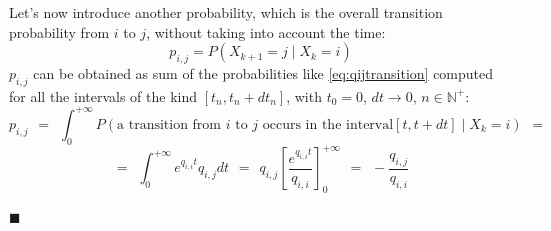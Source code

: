 \documentclass[12pt,a4paper]{article}
\begin{document}
\noindent 
Let's now introduce another probability, which is the overall transition probability from $i$ to $j$, without taking into account the time:
$$
p_{i,j}=P(X_{k+1}=j  \mid  X_k=i)
$$
$p_{i,j}$ can be obtained as sum of the probabilities like \ref{eq:qijtransition} computed for all the intervals of the kind 
$[t_n,t_n+dt_n]$, with $t_0=0$, $dt \rightarrow 0$, $n\in \mathbb{N}^+$:
$$
p_{i,j}
\hspace{5pt}
=
\hspace{5pt}
\int_0^{+\infty}{P\left( \textrm{a transition from }i\textrm{ to }j 
\textrm{ occurs in the interval} \left[ t, t+dt\right]
 \mid 
X_k=i
\right)} 
\hspace{5pt}
=
$$
$$
=
\hspace{5pt}
\int_0^{+\infty}{
e^{q_{i,i} t}q_{i,j}dt
}
\hspace{5pt}
=
\hspace{5pt}
q_{i,j}\left[ \frac{e^{q_{i,i}t}}{q_{i,i}}\right]_0^{+\infty}
\hspace{5pt}
=
\hspace{5pt}
-\frac{q_{i,j}}{q_{i,i}}
$$
\begin{flushright}
$\blacksquare$
\end{flushright}
\newpage
\end{document}
